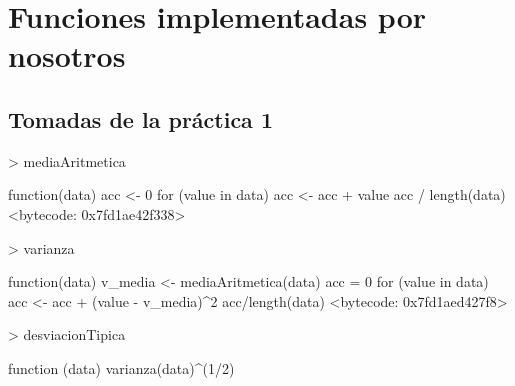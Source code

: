 \documentclass [a4paper] {article}
\begin{document}
\newpage
\section{Funciones implementadas por nosotros}
\subsection{Tomadas de la práctica 1}
\begin{Schunk}
\begin{Sinput}
> mediaAritmetica
\end{Sinput}
\begin{Soutput}
function(data){
  acc <- 0
  for (value in data) {
    acc <- acc + value
  }
  acc / length(data)
}
<bytecode: 0x7fd1ae42f338>
\end{Soutput}
\begin{Sinput}
> varianza
\end{Sinput}
\begin{Soutput}
function(data) {
  v_media <- mediaAritmetica(data)
  acc = 0
  for (value in data){
    acc <- acc + (value - v_media)^2
  }
  acc/length(data)
}
<bytecode: 0x7fd1aed427f8>
\end{Soutput}
\begin{Sinput}
> desviacionTipica
\end{Sinput}
\begin{Soutput}
function (data) {
  varianza(data)^(1/2)
}
\end{Soutput}
\end{Schunk}
\end{document}
